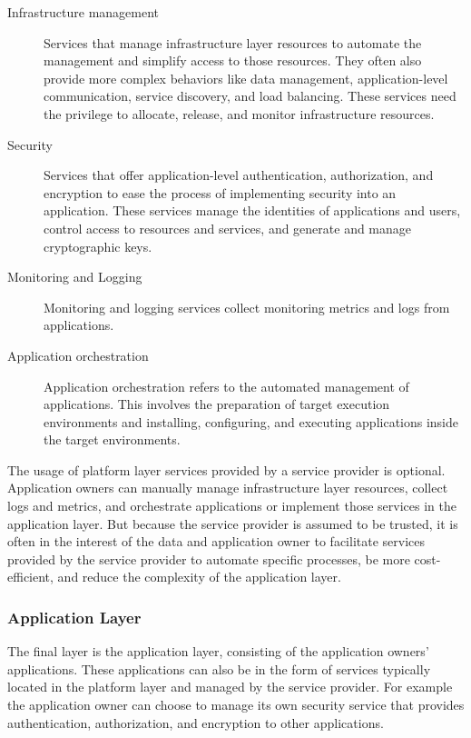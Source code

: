 \begin{description}
  \item[Infrastructure management]
    Services that manage infrastructure layer resources to automate the
    management and simplify access to those resources. They often also provide
    more complex behaviors like data management, application-level
    communication, service discovery, and load balancing. These services need
    the privilege to allocate, release, and monitor infrastructure resources.

  \item[Security]
    Services that offer application-level authentication, authorization, and
    encryption to ease the process of implementing security into an application.
    These services manage the identities of applications and users, control
    access to resources and services, and generate and manage cryptographic
    keys.

  \item[Monitoring and Logging]
    Monitoring and logging services collect monitoring metrics and logs from
    applications.

  \item[Application orchestration]
    Application orchestration refers to the automated management of
    applications. This involves the preparation of target execution environments
    and installing, configuring, and executing applications inside the target
    environments.
\end{description}

The usage of platform layer services provided by a service provider is optional.
Application owners can manually manage infrastructure layer resources, collect
logs and metrics, and orchestrate applications or implement those services in
the application layer. But because the service provider is assumed to be
trusted, it is often in the interest of the data and application owner to
facilitate services provided by the service provider to automate specific
processes, be more cost-efficient, and reduce the complexity of the application
layer.

\subsubsection{Application Layer}

The final layer is the application layer, consisting of the application owners'
applications. These applications can also be in the form of services typically
located in the platform layer and managed by the service provider. For example
the application owner can choose to manage its own security service that
provides authentication, authorization, and encryption to other applications.

